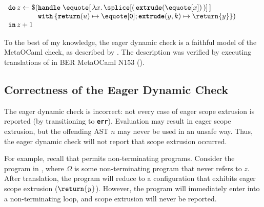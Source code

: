 \begin{code} 
 \begin{source}
  $\begin{array}{l}
      \textbf{\texttt{do}} \, z \leftarrow \$(\textbf{\texttt{handle}} \; \equote[{\, \lambda x. \,\splice[(\,{{ \textbf{\texttt{extrude}}(\equote[x])}}\,)] \,}] \\
      \quad\quad\quad\quad\,\textbf{\texttt{with}} \, \{ \textbf{\texttt{return}}(u) \mapsto {\equote[\texttt{0}]}; \textbf{\texttt{extrude}}(y, k) \mapsto {\return{y}}\})\\
      \textbf{\texttt{in}} \, z + 1
    \end{array}$
 \end{source}
 \label{listing:eager-scope-extrusion-check-eg-tls}
\end{code}

To the best of my knowledge, the eager dynamic check is a faithful model of the MetaOCaml check, as described by \citet{kiselyov-24}. The description was verified by executing translations of  in BER MetaOCaml N153 (). 

\subsection{Correctness of the Eager Dynamic Check}\label{subsection:eager-dynamic-correctness}
The eager dynamic check is incorrect: not every case of eager scope extrusion is reported (by transitioning to \textbf{\texttt{err}}). Evaluation may result in eager scope extrusion, but the offending AST $n$ may never be used in an unsafe way. Thus, the eager dynamic check will not report that scope extrusion occurred. 

For example, recall that \sourceLang{} permits non-terminating programs. Consider the \sourceLang{} program in , where $\Omega$ is some non-terminating program that never refers to $z$. After translation, the program will reduce to a configuration that exhibits eager scope extrusion ($\return{y}$). However, the program will immediately enter into a non-terminating loop, and scope extrusion will never be reported.

